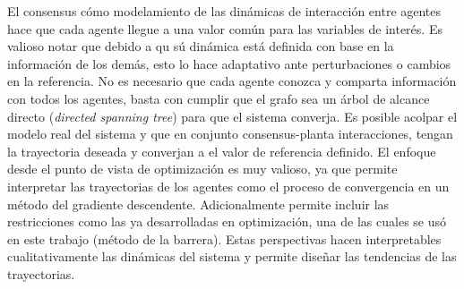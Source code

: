 
El consensus cómo modelamiento de las dinámicas de interacción entre agentes hace que cada agente llegue a una valor común para las variables de interés. Es valioso notar que debido a qu sú dinámica está definida con base en la información de los demás, esto lo hace adaptativo ante perturbaciones o cambios en la referencia.
No es necesario que cada agente conozca y comparta información con todos los agentes, basta con cumplir que el grafo sea un árbol de alcance directo (\textit{directed spanning tree}) para que el sistema converja.
Es posible acolpar el modelo real del sistema y que en conjunto consensus-planta interacciones, tengan la trayectoria deseada y converjan a el valor de referencia definido.
El enfoque desde el punto de vista de optimización es muy valioso, ya que permite interpretar las trayectorias de los agentes como el proceso de convergencia en un método del gradiente descendente. Adicionalmente permite incluir las restricciones como las ya desarrolladas en optimización, una de las cuales se usó en este trabajo (método de la barrera).
Estas perspectivas hacen interpretables cualitativamente las dinámicas del sistema y permite diseñar las tendencias de las trayectorias.